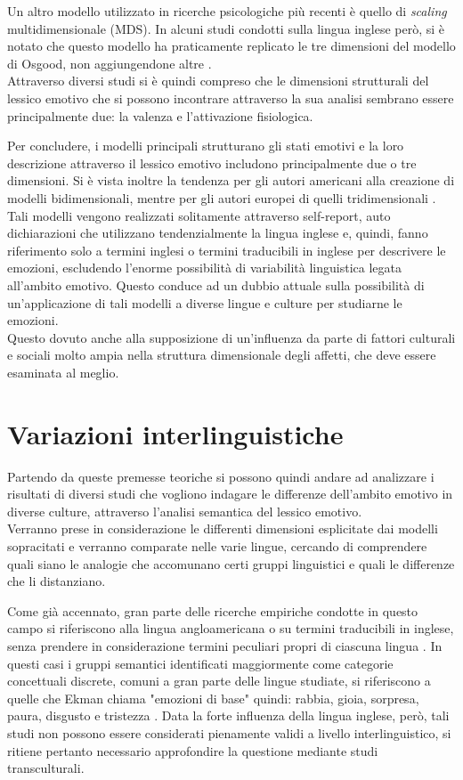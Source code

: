 Un altro modello utilizzato in ricerche psicologiche più recenti è quello di \textit{scaling} multidimensionale (MDS). In alcuni studi condotti sulla lingua inglese però, si è notato che questo modello ha praticamente replicato le tre dimensioni del modello di Osgood, non aggiungendone altre \parencite{russell_multidimensional}. \\
Attraverso diversi studi si è quindi compreso che le dimensioni strutturali del lessico emotivo che si possono incontrare attraverso la sua analisi sembrano essere principalmente due: la valenza e l'attivazione fisiologica. 

Per concludere, i modelli principali strutturano gli stati emotivi e la loro descrizione attraverso il lessico emotivo includono principalmente due o tre dimensioni. Si è vista inoltre la tendenza per gli autori americani alla creazione di modelli bidimensionali, mentre per gli autori europei di quelli tridimensionali \parencite{model}.\\
Tali modelli vengono realizzati solitamente attraverso self-report, auto dichiarazioni che utilizzano tendenzialmente la lingua inglese e, quindi, fanno riferimento solo a termini inglesi o termini traducibili in inglese per descrivere le emozioni, escludendo l'enorme possibilità di variabilità linguistica legata all'ambito emotivo. Questo conduce ad un dubbio attuale sulla possibilità di un'applicazione di tali modelli a diverse lingue e culture per studiarne le emozioni.\\
Questo dovuto anche alla supposizione di un'influenza da parte di fattori culturali e sociali molto ampia nella struttura dimensionale degli affetti, che deve essere esaminata al meglio.

\section{Variazioni interlinguistiche}
Partendo da queste premesse teoriche si possono quindi andare ad analizzare i risultati di diversi studi che vogliono indagare le differenze dell'ambito emotivo in diverse culture, attraverso l'analisi semantica del lessico emotivo.\\
Verranno prese in considerazione le differenti dimensioni esplicitate dai modelli sopracitati e verranno comparate nelle varie lingue, cercando di comprendere quali siano le analogie che accomunano certi gruppi linguistici e quali le differenze che li distanziano.

Come già accennato, gran parte delle ricerche empiriche condotte in questo campo si riferiscono alla lingua angloamericana o su termini traducibili in inglese, senza prendere in considerazione termini peculiari propri di ciascuna lingua \parencite{russell_multidimensional}. In questi casi i gruppi semantici identificati maggiormente come categorie concettuali discrete, comuni a gran parte delle lingue studiate, si riferiscono a quelle che Ekman chiama "emozioni di base" quindi: rabbia, gioia, sorpresa, paura, disgusto e tristezza \parencite{ekman}. Data la forte influenza della lingua inglese, però, tali studi non possono essere considerati pienamente validi a livello interlinguistico, si ritiene pertanto necessario approfondire la questione mediante  studi transculturali.  

